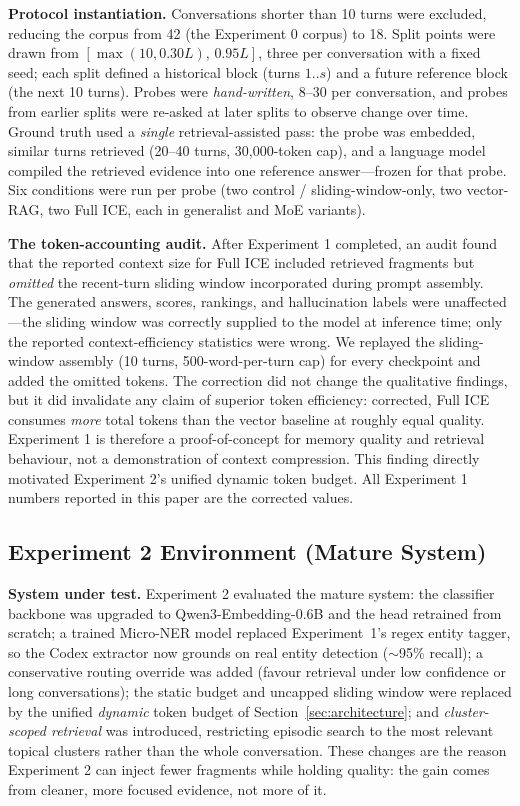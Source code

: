 \documentclass[10pt]{article}
\begin{document}
\textbf{Protocol instantiation.} Conversations shorter than 10 turns were excluded, reducing the corpus from 42 (the Experiment 0 corpus) to 18. Split points were drawn from $[\max(10,0.30L),\,0.95L]$, three per conversation with a fixed seed; each split defined a historical block (turns $1..s$) and a future reference block (the next 10 turns). Probes were \emph{hand-written}, 8--30 per conversation, and probes from earlier splits were re-asked at later splits to observe change over time. Ground truth used a \emph{single} retrieval-assisted pass: the probe was embedded, similar turns retrieved (20--40 turns, 30{,}000-token cap), and a language model compiled the retrieved evidence into one reference answer---frozen for that probe. Six conditions were run per probe (two control / sliding-window-only, two vector-RAG, two Full ICE, each in generalist and MoE variants).

\textbf{The token-accounting audit.} After Experiment 1 completed, an audit found that the reported context size for Full ICE included retrieved fragments but \emph{omitted} the recent-turn sliding window incorporated during prompt assembly. The generated answers, scores, rankings, and hallucination labels were unaffected---the sliding window was correctly supplied to the model at inference time; only the reported context-efficiency statistics were wrong. We replayed the sliding-window assembly (10 turns, 500-word-per-turn cap) for every checkpoint and added the omitted tokens. The correction did not change the qualitative findings, but it did invalidate any claim of superior token efficiency: corrected, Full ICE consumes \emph{more} total tokens than the vector baseline at roughly equal quality. Experiment 1 is therefore a proof-of-concept for memory quality and retrieval behaviour, not a demonstration of context compression. This finding directly motivated Experiment 2's unified dynamic token budget. All Experiment 1 numbers reported in this paper are the corrected values.

\subsection{Experiment 2 Environment (Mature System)}
\label{sec:exp2-env}

\textbf{System under test.} Experiment 2 evaluated the mature system: the classifier backbone was upgraded to Qwen3-Embedding-0.6B and the head retrained from scratch; a trained Micro-NER model replaced Experiment~1's regex entity tagger, so the Codex extractor now grounds on real entity detection ($\sim$95\% recall); a conservative routing override was added (favour retrieval under low confidence or long conversations); the static budget and uncapped sliding window were replaced by the unified \emph{dynamic} token budget of Section~\ref{sec:architecture}; and \emph{cluster-scoped retrieval} was introduced, restricting episodic search to the most relevant topical clusters rather than the whole conversation. These changes are the reason Experiment 2 can inject fewer fragments while holding quality: the gain comes from cleaner, more focused evidence, not more of it.
\end{document}
